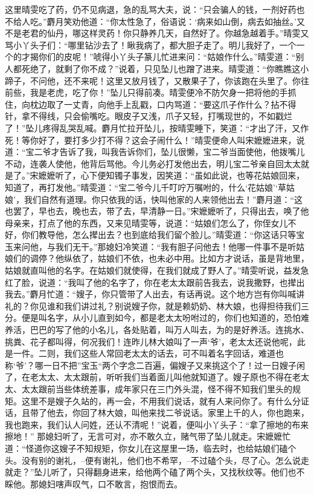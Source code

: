 \documentclass[12pt,oneside]{book}
\begin{document}
这里晴雯吃了药，仍不见病退，急的乱骂大夫，说：“只会骗人的钱，一剂好药也不给人吃。”麝月笑劝他道：“你太性急了，俗语说：‘病来如山倒，病去如抽丝。’又不是老君的仙丹，哪这样灵药！你只静养几天，自然好了。你越急越着手。”晴雯又骂小丫头子们：“哪里钻沙去了！瞅我病了，都大胆子走了。明儿我好了，一个一个的才揭你们的皮呢！”唬得小丫头子篆儿忙进来问：“姑娘作什么。”晴雯道：“别人都死绝了，就剩了你不成？”说着，只见坠儿也蹭了进来。晴雯道：“你瞧瞧这小蹄子，不问他，还不来呢！这里又放月钱了，又散果子了，你该跑在头里了。你往前些，我是老虎，吃了你！”坠儿只得前凑。晴雯便冷不防欠身一把将他的手抓住，向枕边取了一丈青，向他手上乱戳，口内骂道：“要这爪子作什么？拈不得针，拿不得线，只会偷嘴吃。眼皮子又浅，爪子又轻，打嘴现世的，不如戳烂了！”坠儿疼得乱哭乱喊。麝月忙拉开坠儿，按晴雯睡下，笑道：“才出了汗，又作死！等你好了，要打多少打不得？这会子闹什么！”晴雯便命人叫宋嬷嬷进来，说道：“宝二爷才告诉了我，叫我告诉你们，坠儿很懒，宝二爷当面使他，他拨嘴儿不动，连袭人使他，他背后骂他。今儿务必打发他出去，明儿宝二爷亲自回太太就是了。”宋嬷嬷听了，心下便知镯子事发，因笑道：“虽如此说，也等花姑娘回来，知道了，再打发他。”晴雯道：“宝二爷今儿千叮咛万嘱咐的，什么‘花姑娘’‘草姑娘’，我们自然有道理。你只依我的话，快叫他家的人来领他出去！”麝月道：“这也罢了，早也去，晚也去，带了去，早清静一日。”宋嬷嬷听了，只得出去，唤了他母亲来，打点了他的东西，又来见晴雯等，说道：“姑娘们怎么了，你侄女儿不好，你们教导他，怎么撵出去？也到底给我们留个脸儿。”晴雯道：“你这话只等宝玉来问他，与我们无干。”那媳妇冷笑道：“我有胆子问他去！他哪一件事不是听姑娘们的调停？他纵依了，姑娘们不依，也未必中用。比如方才说话，虽是背地里，姑娘就直叫他的名字。在姑娘们就使得，在我们就成了野人了。”晴雯听说，益发急红了脸，说道：“我叫了他的名字了，你在老太太跟前告我去，说我撒野，也撵出我去。”麝月忙道：“嫂子，你只管带了人出去，有话再说。这个地方岂有你叫喊讲礼的？你见谁和我们讲过礼？别说嫂子你，就是赖奶奶、林大娘，也得担待我们三分。便是叫名字，从小儿直到如今，都是老太太吩咐过的，你们也知道的，恐怕难养活，巴巴的写了他的小名儿，各处贴着，叫万人叫去，为的是好养活。连挑水、挑粪、花子都叫得，何况我们！连昨儿林大娘叫了一声‘爷’，老太太还说他呢，此是一件。二则，我们这些人常回老太太的话去，可不叫着名字回话，难道也称‘爷’？哪一日不把”宝玉“两个字念二百遍，偏嫂子又来挑这个了！过一日嫂子闲了，在老太太、太太跟前，听听我们当着面儿叫他就知道了。嫂子原也不得在老太太、太太跟前当些体统差事，成年家只在三门外头混，怪不得不知我们里头的规矩。这里不是嫂子久站的，再一会，不用我们说话，就有人来问你了。有什么分证话，且带了他去，你回了林大娘，叫他来找二爷说话。家里上千的人，你也跑来，我也跑来，我们认人问姓，还认不清呢！”说着，便叫小丫头子：“拿了擦地的布来擦地！”
那媳妇听了，无言可对，亦不敢久立，赌气带了坠儿就走。宋嬷嬷忙道：“怪道你这嫂子不知规矩，你女儿在这屋里一场，临去时，也给姑娘们磕个头。没有别的谢礼，--便有谢礼，他们也不希罕，--不过磕个头，尽了心。怎么说走就走？”坠儿听了，只得翻身进来，给他两个磕了两个头，又找秋纹等。他们也不睬他。那媳妇嗐声叹气，口不敢言，抱恨而去。
\end{document}
